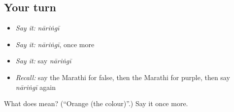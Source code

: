 \subsection*{Your turn}
\begin{itemize}
\raggedright
  \item \emph{Say it:} \emph{nāriṅgī}
  \item \emph{Say it:} \emph{nāriṅgī}, once more
  \item \emph{Say it:} say \emph{nāriṅgī}
  \item \emph{Recall:} say the Marathi for false, then the Marathi for purple, then say \emph{nāriṅgī} again
\end{itemize}

\begin{tcolorbox}[breakable,colback=teal!4,colframe=teal!35!black,title={Before you move on}]
What does  mean? (\textquotedblleft{}Orange (the colour)\textquotedblright{}.) Say it once more.
\end{tcolorbox}
